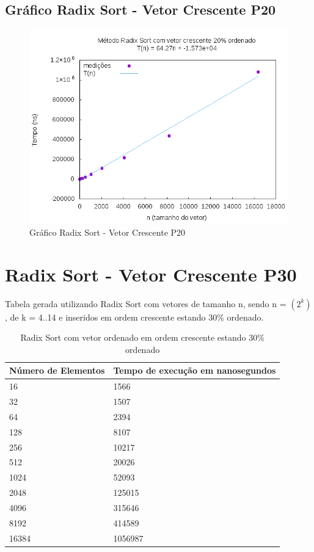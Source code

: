 \documentclass[12pt,a4paper,twoside]{report}
\begin{document}
\subsection{Gráfico Radix Sort - Vetor Crescente P20}
\begin{figure}[H]
    \centering
    \includegraphics[width=0.7\linewidth]{graficos/RadixSort/vIntCrescenteP20/vIntCrescenteP20.png}
  \caption{Gráfico Radix Sort - Vetor Crescente P20}
\end{figure}

\section{Radix Sort - Vetor Crescente P30}
Tabela gerada utilizando Radix Sort com vetores de tamanho n, sendo n = $(2^k)$, de k = 4..14 e inseridos em ordem crescente estando 30\% ordenado.
\begin{table}[H]
\centering
\caption{Radix Sort com vetor ordenado em ordem crescente estando 30\% ordenado}
\label{my-label}
\begin{tabular}{|l|l|}
\hline
\multicolumn{1}{|c|}{\textbf{Número de Elementos}} & \multicolumn{1}{c|}{\textbf{Tempo de execução em nanosegundos}} \\ \hline
16 & 1566 \\ \hline
32 & 1507 \\ \hline
64 & 2394 \\ \hline
128 & 8107 \\ \hline
256 & 10217 \\ \hline
512 & 20026 \\ \hline
1024 & 52093 \\ \hline
2048 & 125015 \\ \hline
4096 & 315646 \\ \hline
8192 & 414589 \\ \hline
16384 & 1056987 \\ \hline
\end{tabular}
\end{table}
\end{document}
